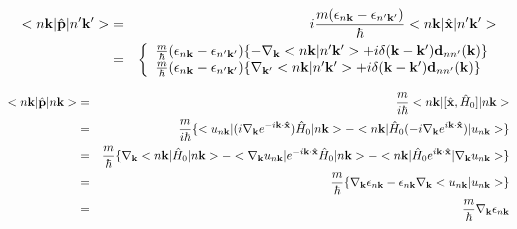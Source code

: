 \documentclass[aps,prb,preprint]{revtex4-1}
\begin{document}
\begin{appendix}
\begin{eqnarray}
<n{\bf k}|\hat{\bf p}|n'{\bf k'}> &=&i \frac{m(\epsilon_{n{\bf k}}-\epsilon_{n'{\bf k'}})}{\hbar} <n{\bf k}|\hat{\bf x}|n'{\bf k'}> \nonumber \\
&=&\left\{
\begin{array}{l}
\frac{m}{\hbar}(\epsilon_{n{\bf k}}-\epsilon_{n'{\bf k'}})\{-\nabla_{\bf k} <n{\bf k}|n'{\bf k'}> + i \delta({\bf k-k'}) {\bf d}_{nn'}({\bf k})\}  \\
\frac{m}{\hbar}(\epsilon_{n{\bf k}}-\epsilon_{n'{\bf k'}})\{\nabla_{\bf k'} <n{\bf k}|n'{\bf k'}> + i \delta({\bf k-k'}) {\bf d}_{nn'}({\bf k})\} 
\end{array}
\right.
\end{eqnarray} 

\begin{eqnarray}
<n{\bf k}|\hat{\bf p}|n{\bf k}> &=& \frac{m}{i \hbar} <n{\bf k}|[\hat{\bf x},\hat{H}_0]|n{\bf k}> \nonumber \\
&=& \frac{m}{i \hbar} \{ <u_{n{\bf k}}| (i \nabla_{\bf k} e^{-i{\bf k \cdot \hat{x} }} ) \hat{H}_0 |n{\bf k}> - <n{\bf k}| \hat{H}_0 (-i\nabla_{\bf k} e^{i{\bf k \cdot \hat{x}} }) |u_{n{\bf k}}> \} \nonumber \\
&=& \frac{m}{\hbar} \{  \nabla_{\bf k} <n{\bf k}|\hat{H}_0|n{\bf k}> - <\nabla_{\bf k} u_{n{\bf k}}| e^{-i{\bf k \cdot \hat{x}} } \hat{H}_0  |n{\bf k}> - <n{\bf k}| \hat{H}_0 e^{i{\bf k \cdot \hat{x}} }|\nabla_{\bf k} u_{n{\bf k}}> \} \nonumber \\
&=& \frac{m}{\hbar} \{  \nabla_{\bf k} \epsilon_{n{\bf k}} -  \epsilon_{n{\bf k}} \nabla_{\bf k} <u_{n{\bf k}}| u_{n{\bf k}}>\}  \nonumber \\
&=& \frac{m}{\hbar} \nabla_{\bf k} \epsilon_{n{\bf k}}
\end{eqnarray} 


\end{appendix}
\end{document}
